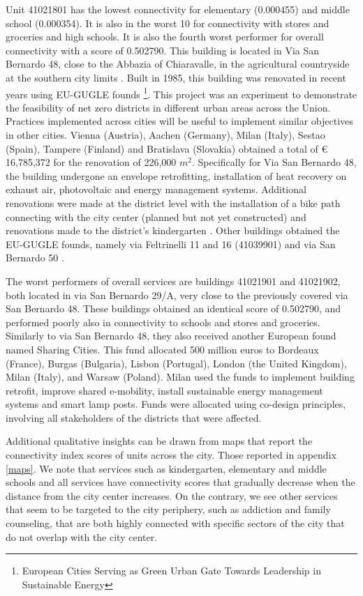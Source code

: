 \documentclass[12pt]{article}
\begin{document}
Unit 41021801 has the lowest connectivity for elementary (0.000455) and middle school (0.000354). It is also in the worst 10 for connectivity with stores and groceries and high schools. It is also the fourth worst performer for overall connectivity with a score of 0.502790. This building is located in Via San Bernardo 48, close to the Abbazia of Chiaravalle, in the agricultural countryside at the southern city limits \parencite{breda_tua_2016}. Built in 1985,  this building was renovated in recent years using EU-GUGLE founds \footnote{European Cities Serving as Green Urban Gate Towards Leadership in Sustainable Energy}. This project was an experiment to demonstrate the feasibility of net zero districts in different urban areas across the Union. Practices implemented across cities will be useful to implement similar objectives in other cities. Vienna (Austria), Aachen (Germany), Milan (Italy), Sestao (Spain), Tampere (Finland) and Bratislava (Slovakia) obtained a total of  € 16,785,372 for the renovation of 226,000 $m^2$. Specifically for Via San Bernardo 48, the building undergone an envelope retrofitting, installation of heat recovery on exhaust air, photovoltaic and energy management systems. Additional renovations were made at the district level with the installation of a bike path connecting with the city center (planned but not yet constructed) and renovations made to the district's kindergarten \parencite{neri_slow_2020}. Other buildings obtained the EU-GUGLE founds, namely via Feltrinelli 11 and 16 (41039901) and via San Bernardo 50 \parencite{morishita2017eu}.

The worst performers of overall services are buildings 41021901 and 41021902, both located in via San Bernardo 29/A, very close to the previously covered via San Bernardo 48. These buildings obtained an identical score of 0.502790, and performed poorly also in connectivity to schools and stores and groceries. Similarly to  via San Bernardo 48, they also received another European found named Sharing Cities. This fund allocated 500 million euros to  Bordeaux (France), Burgas (Bulgaria), Lisbon (Portugal), London (the United Kingdom), Milan (Italy), and Warsaw (Poland). Milan used the funds to implement building retrofit, improve shared e-mobility, install sustainable energy management systems and smart lamp posts. Funds were allocated using co-design principles, involving all stakeholders of the districts that were affected.

Additional qualitative insights can be drawn from maps that report the connectivity index scores of units across the city. Those reported in appendix \ref{maps}. We note that services such as kindergarten, elementary and middle schools and all services have connectivity scores that gradually decrease when the distance from the city center increases. On the contrary, we see other services that seem to be targeted to the city periphery, such as addiction and family counseling, that are both highly connected with specific sectors of the city that do not overlap with the city center.
\end{document}
